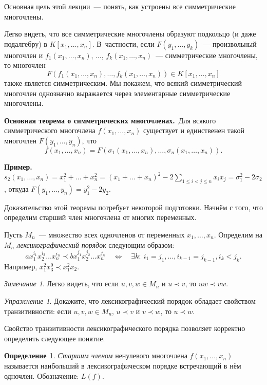 \documentclass[a4paper,10pt]{amsart}
\theoremstyle{definition}
\newtheorem{definition}{Определение}
\theoremstyle{remark}
\newtheorem{exercise}{Упражнение}
\newtheorem{remark}{Замечание}
\begin{document}
Основная цель этой лекции~--- понять, как устроены все
симметрические многочлены.

Легко видеть, что все симметрические многочлены образуют подкольцо
(и даже подалгебру) в $K[x_1, \ldots, x_n]$. В~частности, если
$F(y_1, \ldots, y_k)$~--- произвольный многочлен и $f_1(x_1, \ldots,
x_n)$, $\ldots$, $f_k(x_1, \ldots, x_n)$~--- симметрические
многочлены, то многочлен
$$
F(f_1(x_1, \ldots, x_n), \ldots, f_k(x_1, \ldots, x_n)) \in K[x_1,
\ldots, x_n]
$$
также является симметрическим. Мы покажем, что всякий симметрический
многочлен однозначно выражается через элементарные симметрические
многочлены.

\medskip

{\bf Основная теорема о симметрических многочленах.}\ Для всякого
симметрического многочлена $f(x_1, \ldots, x_n)$ существует и
единственен такой многочлен $F(y_1, \ldots, y_n)$, что
$$
f(x_1, \ldots, x_n) = F(\sigma_1(x_1, \ldots, x_n), \ldots,
\sigma_n(x_1, \ldots, x_n)).
$$

\textbf{Пример.} $s_2(x_1, \ldots, x_n) = x_1^2 + \ldots + x_n^2 =
(x_1 + \ldots + x_n)^2 - 2\sum \limits_{1 \leqslant i < j \leqslant
n} x_i x_j = \sigma_1^2 - 2\sigma_2$, откуда $F(y_1, \ldots, y_n) =
y_1^2 - 2y_2$.


Доказательство этой теоремы потребует некоторой подготовки. Начнём с
того, что определим старший член многочлена от многих переменных.

Пусть $M_n$~--- множество всех одночленов от переменных $x_1,
\ldots, x_n$. Определим на $M_n$ {\it лексикографический порядок}
следующим образом:
$$
ax_1^{i_1}x_2^{i_2}\ldots x_n^{i_n} \prec bx_1^{j_1}x_2^{j_2}\ldots
x_n^{j_n} \quad \Leftrightarrow \quad \exists k: \: i_1=j_1,\ldots,
i_{k-1}=j_{k-1}, i_k<j_k.
$$
Например, $x_1^2x_3^9 \prec x_1^2x_2$.

\begin{remark}
Легко видеть, что если $u,v,w \in M_n$ и $u \prec v$, то $uw \prec
vw$.
\end{remark}

\begin{exercise}
Докажите, что лексикографический порядок обладает свойством
транзитивности: если $u,v,w \in M_n$, $u \prec v$ и $v \prec w$, то
$u \prec w$.
\end{exercise}

Свойство транзитивности лексикографического порядка позволяет
корректно определить следующее понятие.

\begin{definition}
{\it Старшим членом} ненулевого многочлена $f(x_1,\ldots,x_n)$
называется наибольший в лексикографическом порядке встречающий в нём
одночлен. Обозначение: $L(f)$.
\end{definition}
\end{document}
